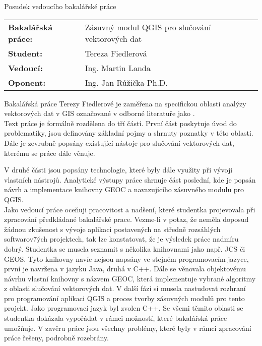 \documentclass[czech,11pt,a4paper]{article}
\begin{document}
\begin{center}
  {\Large Posudek vedoucího bakalářské práce}
\end{center}

\vspace{.5cm}

\noindent \begin{tabular}{lp{}}
  {\bf Bakalářská práce:} &
  Zásuvný modul QGIS pro slučování vektorových dat \\
  {\bf Student:} & Tereza Fiedlerová \\
  {\bf Vedoucí:} & Ing. Martin Landa \\
  {\bf Oponent:} & Ing. Jan Růžička Ph.D. \\
\end{tabular}

\vspace{1cm}

Bakalářská práce Terezy Fiedlerové je zaměřena na specifickou oblasti
analýzy vektorových dat v GIS označované v odborné literatuře jako
.
\\

Text práce je formálně rozdělena do tří částí. První část poskytuje
úvod do problematiky, jsou definovány základní pojmy a shrnuty
poznatky v této oblasti. Dále je zevrubně popsány existující nástoje
pro slučování vektorových dat, kterému se práce dále věnuje.

V druhé části jsou popsány technologie, které byly dále využity při
vývoji vlastních nástrojů. Analytické výstupy práce shrnuje část
poslední, kde je popsán návrh a implementace knihovny GEOC a
navazujícího zásuvného modulu pro QGIS. 
\\

Jako vedoucí práce oceňuji pracovitost a nadšení, které studentka
projevovala při zpracování předkládané bakalářské prace. Vezme-li v
potaz, že neměla doposud žádnou zkušenost s vývoje aplikaci
postavených na středně rozsáhlých softwarov7ých projektech, tak lze
konstatovat, že je výsledek práce nadmíru dobrý. Studentka se musela
seznamit s několika knihovnami jako např. JCS či GEOS. Tyto knihovny
navíc nejsou napsány ve stejném programovacím jazyce, první je
navržena v jazyku Java, druhá v C++. Dále se věnovala objektovému
návrhu vlastní knihovny s názvem GEOC, která implementuje vybrané
algoritmy z oblasti slučování vektorových dat. V další fázi si musela
nastudovat rozhraní pro programování aplikaci QGIS a proces tvorby
zásuvných modulů pro tento projekt. Jako programovací jazyk byl zvolen
C++. Se všemi těmito oblasti se studentka dokázala vypořádat v rámci
možností, které bakalářská práce umožňuje. V zavěru práce jsou všechny
problémy, které byly v rámci zpracování práce řešeny, podrobně
rozebrány.
\\
\end{document}
